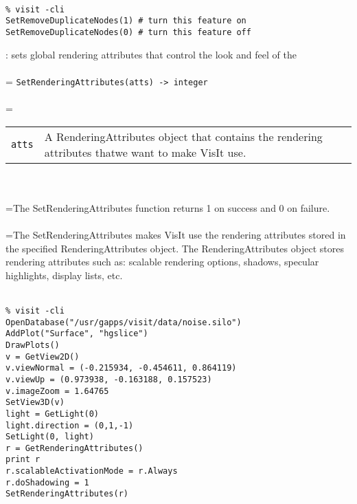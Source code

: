 \documentclass[10pt,a4paper]{report}
\begin{document}
\\[-6mm]
\begin{verbatim}% visit -cli
SetRemoveDuplicateNodes(1) # turn this feature on
SetRemoveDuplicateNodes(0) # turn this feature off
\end{verbatim}
\newpage


{}
: sets global rendering attributes that control the look and feel of the\\[-3mm]

 \\ 
\hangindent=\parindent 
\verb!SetRenderingAttributes(atts) -> integer!\\ [-3mm]

 \\ 
\hangindent=\parindent 
\begin{tabular}{lp{9cm}}
\verb!atts! & A RenderingAttributes object that contains the rendering attributes thatwe want to make VisIt use. \\
\end{tabular} \\[-2mm]


 \\ 
\hangindent=\parindent The SetRenderingAttributes function returns 1 on success and 0 on failure. \\[-3mm] 

 \\ 
\hangindent=\parindent The SetRenderingAttributes makes VisIt use the rendering attributes stored in the specified RenderingAttributes object. The RenderingAttributes object stores rendering attributes such as: scalable rendering options, shadows, specular highlights, display lists, etc. \\[-3mm] 

\\[-6mm]
\begin{verbatim}% visit -cli
OpenDatabase("/usr/gapps/visit/data/noise.silo")
AddPlot("Surface", "hgslice")
DrawPlots()
v = GetView2D()
v.viewNormal = (-0.215934, -0.454611, 0.864119)
v.viewUp = (0.973938, -0.163188, 0.157523)
v.imageZoom = 1.64765
SetView3D(v)
light = GetLight(0)
light.direction = (0,1,-1)
SetLight(0, light)
r = GetRenderingAttributes()
print r
r.scalableActivationMode = r.Always
r.doShadowing = 1
SetRenderingAttributes(r)
\end{verbatim}
\newpage
\end{document}
